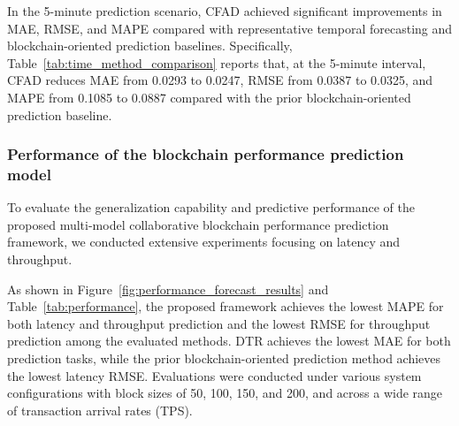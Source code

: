 \documentclass[a4paper,fleqn]{cas-dc}
\begin{document}
In the 5-minute prediction scenario, CFAD achieved significant improvements in MAE, RMSE, and MAPE compared with representative temporal forecasting and blockchain-oriented prediction baselines. %
Specifically, Table~\ref{tab:time_method_comparison} reports that, at the 5-minute interval, CFAD reduces MAE from 0.0293 to 0.0247, RMSE from 0.0387 to 0.0325, and MAPE from 0.1085 to 0.0887 compared with the prior blockchain-oriented prediction baseline.



\subsubsection{Performance of the blockchain performance prediction model}
\vspace{6pt}
To evaluate the generalization capability and predictive performance of the proposed multi-model collaborative blockchain performance prediction framework, we conducted extensive experiments focusing on latency and throughput. 


As shown in Figure~\ref{fig:performance_forecast_results} and Table~\ref{tab:performance}, the proposed framework achieves the lowest MAPE for both latency and throughput prediction and the lowest RMSE for throughput prediction among the evaluated methods. DTR achieves the lowest MAE for both prediction tasks, while the prior blockchain-oriented prediction method \citep{wang2023learningchain} achieves the lowest latency RMSE. Evaluations were conducted under various system configurations with block sizes of 50, 100, 150, and 200, and across a wide range of transaction arrival rates (TPS).
\end{document}
